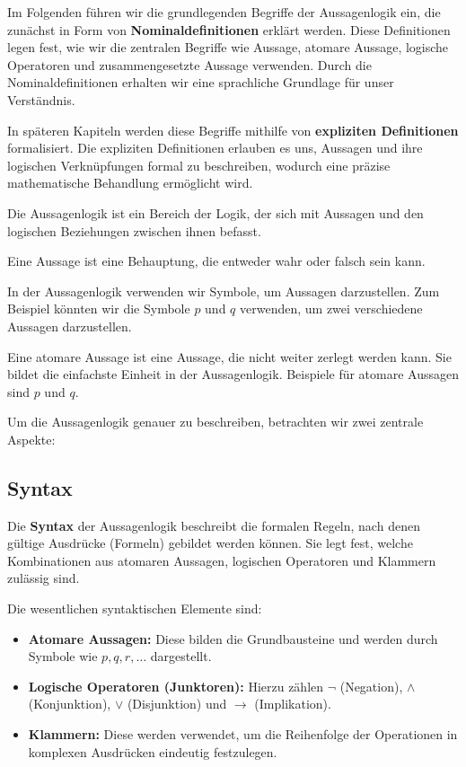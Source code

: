 \documentclass[main.tex]{subfiles}
\begin{document}
Im Folgenden führen wir die grundlegenden Begriffe der Aussagenlogik ein, die zunächst in Form von \textbf{Nominaldefinitionen} erklärt werden. Diese Definitionen legen fest, wie wir die zentralen Begriffe wie Aussage, atomare Aussage, logische Operatoren und zusammengesetzte Aussage verwenden. Durch die Nominaldefinitionen erhalten wir eine sprachliche Grundlage für unser Verständnis.

In späteren Kapiteln werden diese Begriffe mithilfe von \textbf{expliziten Definitionen} formalisiert. Die expliziten Definitionen erlauben es uns, Aussagen und ihre logischen Verknüpfungen formal zu beschreiben, wodurch eine präzise mathematische Behandlung ermöglicht wird.

Die Aussagenlogik ist ein Bereich der Logik, der sich mit Aussagen und den logischen Beziehungen zwischen ihnen befasst.

\begin{definition}[Aussage]
Eine Aussage ist eine Behauptung, die entweder wahr oder falsch sein kann.
\end{definition}

In der Aussagenlogik verwenden wir Symbole, um Aussagen darzustellen. Zum Beispiel könnten wir die Symbole \(p\) und \(q\) verwenden, um zwei verschiedene Aussagen darzustellen.

\begin{definition}
Eine atomare Aussage ist eine Aussage, die nicht weiter zerlegt werden kann. Sie bildet die einfachste Einheit in der Aussagenlogik. Beispiele für atomare Aussagen sind \(p\) und \(q\).
\end{definition}


Um die Aussagenlogik genauer zu beschreiben, betrachten wir zwei zentrale Aspekte:

\subsection{Syntax}

Die \textbf{Syntax} der Aussagenlogik beschreibt die formalen Regeln, nach denen gültige Ausdrücke (Formeln) gebildet werden können. Sie legt fest, welche Kombinationen aus atomaren Aussagen, logischen Operatoren und Klammern zulässig sind.

Die wesentlichen syntaktischen Elemente sind:
\begin{itemize}
    \item \textbf{Atomare Aussagen:} Diese bilden die Grundbausteine und werden durch Symbole wie \(p, q, r, \dots\) dargestellt.
    \item \textbf{Logische Operatoren (Junktoren):} Hierzu zählen \(\neg\) (Negation), \(\land\) (Konjunktion), \(\lor\) (Disjunktion) und \(\rightarrow\) (Implikation).
    \item \textbf{Klammern:} Diese werden verwendet, um die Reihenfolge der Operationen in komplexen Ausdrücken eindeutig festzulegen.
\end{itemize}
\end{document}
